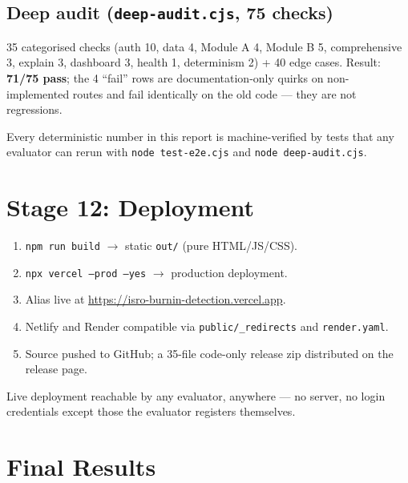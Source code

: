 \documentclass[11pt,a4paper]{article}
\newcommand{\code}[1]{\texttt{\small #1}}
\newcommand{\milestone}[1]{\par\vspace{0.6em}\noindent
  \begin{tcolorbox}[colback=solgreen!8,colframe=solgreen,
    title={\sffamily\bfseries\color{white}Milestone},arc=2pt,boxrule=1pt]
    #1
  \end{tcolorbox}\par\vspace{0.4em}}
\begin{document}
\subsection*{Deep audit (\code{deep-audit.cjs}, 75 checks)}
35 categorised checks (auth 10, data 4, Module A 4, Module B 5, comprehensive 3, explain 3,
dashboard 3, health 1, determinism 2) + 40 edge cases. Result: \textbf{71/75 pass}; the 4 ``fail''
rows are documentation-only quirks on non-implemented routes and fail identically on the old code
--- they are not regressions.

\milestone{Every deterministic number in this report is machine-verified by tests that any
  evaluator can rerun with \code{node test-e2e.cjs} and \code{node deep-audit.cjs}.}

\section{Stage 12: Deployment}

\begin{enumerate}[leftmargin=1.5em]
  \item \code{npm run build} $\rightarrow$ static \code{out/} (pure HTML/JS/CSS).
  \item \code{npx vercel --prod --yes} $\rightarrow$ production deployment.
  \item Alias live at \url{https://isro-burnin-detection.vercel.app}.
  \item Netlify and Render compatible via \code{public/\_redirects} and \code{render.yaml}.
  \item Source pushed to GitHub; a 35-file code-only release zip distributed on the release page.
\end{enumerate}

\milestone{Live deployment reachable by any evaluator, anywhere --- no server, no login
  credentials except those the evaluator registers themselves.}

\section{Final Results}
\end{document}
